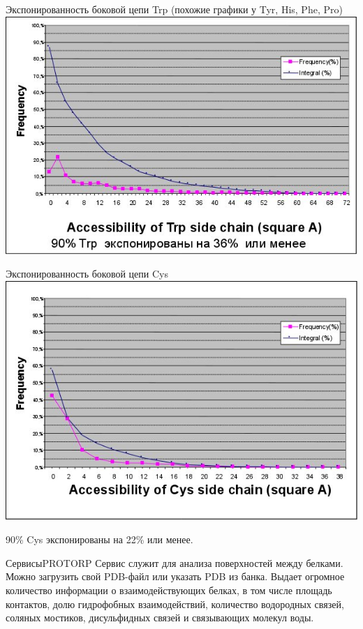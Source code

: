 \documentclass{beamer}
\begin{document}
    \begin{frame}{Экспонированность боковой цепи Trp}
        {(похожие графики у Tyr, His, Phe, Pro)}
        \includegraphics[height=0.8\textheight]{exp-trp.jpg}
    \end{frame}

    \begin{frame}{Экспонированность боковой цепи Cys}
        \includegraphics[height=0.8\textheight]{exp-cys.jpg}

        90\% Cys экспонированы на 22\% или менее.
    \end{frame}

    \begin{frame}{Сервисы}{PROTORP}
    Сервис служит для анализа поверхностей между белками.
    Можно загрузить свой PDB-файл или указать PDB из банка.
    Выдает огромное количество информации о взаимодействующих белках,
    в том числе площадь контактов, долю гидрофобных взаимодействий,
    количество водородных связей, соляных мостиков, дисульфидных связей
    и связывающих молекул воды.
    \end{frame}
\end{document}
